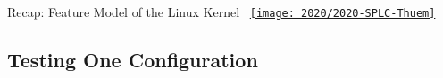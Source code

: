 \begin{frame}{Recap: Feature Model of the Linux Kernel}
	\vspace{28mm}~\hspace{-15mm}\href{https://dl.acm.org/doi/abs/10.1145/3382025.3414943}{\texttt{[image: 2020/2020-SPLC-Thuem]}}
\end{frame}

\newcommand{\eemph}[1]{{\color{red}\textbf{#1}}}

\subsection{Testing One Configuration}
\begin{frame}{\insertsubsection}
	\leftorright{
		\centering\featureDiagramConfigurableDatabase
		
}
\end{frame}
